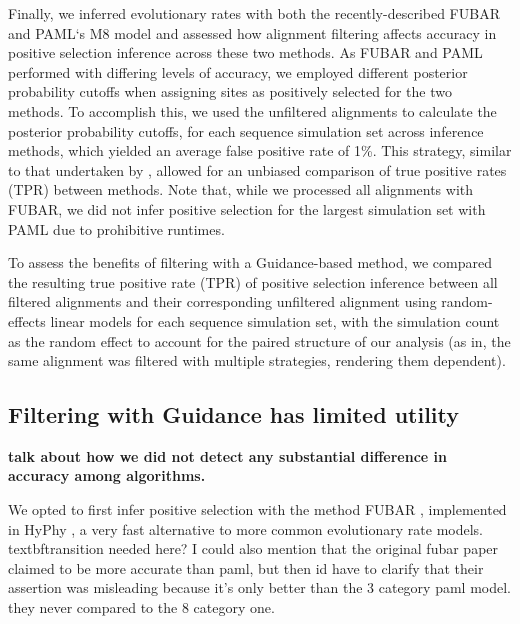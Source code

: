 \documentclass[10pt]{article}
\begin{document}
Finally, we inferred evolutionary rates with both the recently-described FUBAR \citep{Murrell2013} and PAML`s M8 model \citep{Yang2007} and assessed how alignment filtering affects accuracy in positive selection inference across these two methods. As FUBAR and PAML performed with differing levels of accuracy, we employed different posterior probability cutoffs when assigning sites as positively selected for the two methods. To accomplish this, we used the unfiltered alignments to calculate the posterior probability cutoffs, for each sequence simulation set across inference methods, which yielded an average false positive rate of 1\%. This strategy, similar to that undertaken by \citep{Jordan2011}, allowed for an unbiased comparison of true positive rates (TPR) between methods. Note that, while we processed all alignments with FUBAR, we did not infer positive selection for the largest simulation set with PAML due to prohibitive runtimes. 

To assess the benefits of filtering with a Guidance-based method, we compared the resulting true positive rate (TPR) of positive selection inference  between all filtered alignments and their corresponding unfiltered alignment using random-effects linear models for each sequence simulation set, with the simulation count as the random effect to account for the paired structure of our analysis (as in, the same alignment was filtered with multiple strategies, rendering them dependent).

\subsection*{Filtering with Guidance has limited utility}
\textbf{talk about how we did not detect any substantial difference in accuracy among algorithms.}

We opted to first infer positive selection with the method FUBAR \citep{Murrell2013}, implemented in HyPhy \citep{Pond2005}, a very fast  alternative to more common evolutionary rate models. textbf{transition needed here? I could also mention that the original fubar paper claimed to be more accurate than paml, but then id have to clarify that their assertion was misleading because it's only better than the 3 category paml model. they never compared to the 8 category one.} 


%
\end{document}
